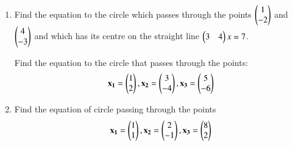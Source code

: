 \renewcommand{\theequation}{\theenumi}
\renewcommand{\thefigure}{\theenumi}
\begin{enumerate}[label=\thesubsection.\arabic*.,ref=\thesubsection.\theenumi]

\item Find the equation to the circle which passes through the points $\begin{pmatrix} 1 \\ -2 \end{pmatrix}$ and $\begin{pmatrix} 4 \\ -3 \end{pmatrix}$ and which has its centre on the straight line $\begin{pmatrix} 3 & 4 \end{pmatrix}x = 7$.
%
\\
\solution

Find the equation to the circle that passes through the points:
\begin{align}
\mathbf{x_1} = \begin{pmatrix}1\\2\end{pmatrix},\mathbf{x_2} = \begin{pmatrix}3\\-4\end{pmatrix} , \mathbf{x_3} = \begin{pmatrix}5\\-6\end{pmatrix}
\end{align}
%
\item Find the equation of circle passing through the points
\begin{align}
    \mathbf{x_1}=\begin{pmatrix}1\\1\end{pmatrix}, \mathbf{x_2}=\begin{pmatrix}2\\-1\end{pmatrix}, \mathbf{x_3}=\begin{pmatrix}8\\2\end{pmatrix}\label{eq:solutions/17/17/eq:0}
\end{align}
%
\\
\solution

\end{enumerate}
